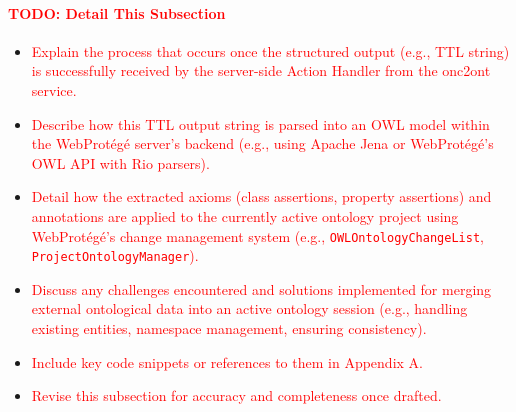     \paragraph{\textcolor{red}{TODO: Detail This Subsection}}
    \begin{itemize}
        \item[\textcolor{red}{$\bullet$}] \textcolor{red}{Explain the process that occurs once the structured output (e.g., TTL string) is successfully received by the server-side Action Handler from the onc2ont service.}
        \item[\textcolor{red}{$\bullet$}] \textcolor{red}{Describe how this TTL output string is parsed into an OWL model within the WebProtégé server's backend (e.g., using Apache Jena or WebProtégé's OWL API with Rio parsers).}
        \item[\textcolor{red}{$\bullet$}] \textcolor{red}{Detail how the extracted axioms (class assertions, property assertions) and annotations are applied to the currently active ontology project using WebProtégé's change management system (e.g., \texttt{OWLOntologyChangeList}, \texttt{ProjectOntologyManager}).}
        \item[\textcolor{red}{$\bullet$}] \textcolor{red}{Discuss any challenges encountered and solutions implemented for merging external ontological data into an active ontology session (e.g., handling existing entities, namespace management, ensuring consistency).}
        \item[\textcolor{red}{$\bullet$}] \textcolor{red}{Include key code snippets or references to them in Appendix A.}
        \item[\textcolor{red}{$\bullet$}] \textcolor{red}{Revise this subsection for accuracy and completeness once drafted.}
    \end{itemize}

